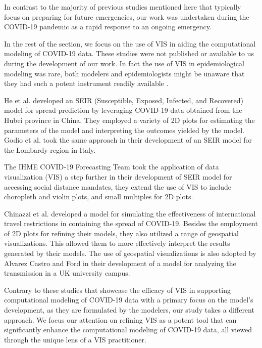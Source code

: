 In contrast to the majority of previous studies mentioned here that typically focus on preparing for future emergencies, our work was undertaken during the COVID-19 pandemic as a rapid response to an ongoing emergency.


In the rest of the section, we focus on the use of \ac{VIS} in aiding the computational modeling of COVID-19 data. These studies were not published or available to us during the development of our work. In fact the use of VIS in epidemiological modeling was rare, both modelers and epidemiologists might be unaware that they had such a potent instrument readily available \cite{chen2022RAMPVIS}.

He et al. \cite{he2020SEIR} developed an SEIR (Susceptible, Exposed, Infected, and Recovered) model for spread prediction by leveraging COVID-19 data obtained from the Hubei province in China. They employed a variety of 2D plots for estimating the parameters of the model and interpreting the outcomes yielded by the model. Godio et al. \cite{godio2020SEIR} took the same approach in their development of an SEIR model for the Lombardy region in Italy.

The IHME COVID-19 Forecasting Team \cite{ihmecovid-19forecastingteam2021Modeling} took the application of data visualization (VIS) a step further in their development of SEIR model for accessing social distance mandates, they extend the use of \ac{VIS} to include choropleth and violin plots, and small multiples for 2D plots.

Chinazzi et al. \cite{chinazzi2020Effect} developed a model for simulating the effectiveness of international travel restrictions in containing the spread of COVID-19. Besides the employment of 2D plots for refining their models, they also utilized a range of geospatial visualizations. This allowed them to more effectively interpret the results generated by their models. The use of geospatial visualizations is also adopted by Alvarez Castro and Ford \cite{alvarezcastro20213D} in their development of a model for analyzing the transmission in a UK university campus.

Contrary to these studies that showcase the efficacy of \ac{VIS} in supporting computational modeling of COVID-19 data with a primary focus on the model's development, as they are formulated by the modelers, our study takes a different approach. We focus our attention on refining \ac{VIS} as a potent tool that can significantly enhance the computational modeling of COVID-19 data, all viewed through the unique lens of a \ac{VIS} practitioner.
